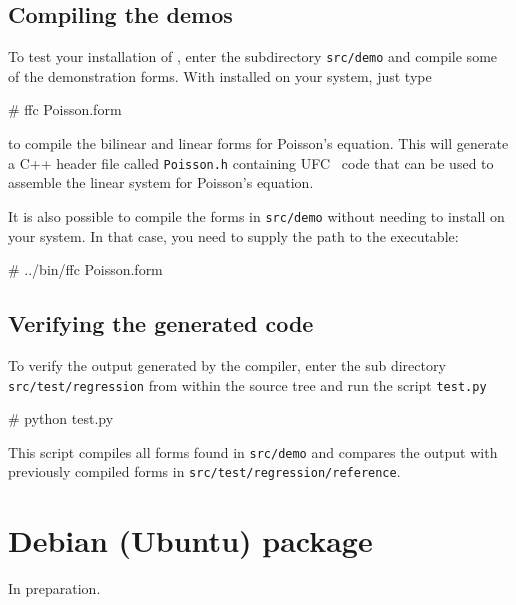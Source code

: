 \subsection{Compiling the demos}

To test your installation of \ffc{}, enter the subdirectory
\texttt{src/demo} and compile some of the demonstration forms.
With \ffc{} installed on your system, just type
\begin{code}
# ffc Poisson.form
\end{code}
to compile the bilinear and linear forms for Poisson's equation.
This will generate a C++ header file called \texttt{Poisson.h}
containing UFC~\cite{www:ufc,ufcmanual} code that can be used to assemble
the linear system for Poisson's equation.

It is also possible to compile the forms in \texttt{src/demo} without
needing to install \ffc{} on your system. In that case, you need to
supply the path to the \ffc{} executable:
\begin{code}
# ../bin/ffc Poisson.form
\end{code}

\subsection{Verifying the generated code}

To verify the output generated by the compiler, enter the sub directory
\texttt{src/test/regression} from within the \ffc{} source tree and
run the script \texttt{test.py}
\begin{code}
# python test.py
\end{code}
This script compiles all forms found in \texttt{src/demo} and compares
the output with previously compiled forms in \texttt{src/test/regression/reference}.

\section{Debian (Ubuntu) package}

In preparation.
